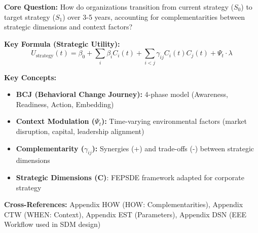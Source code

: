 \begin{tcolorbox}[colback=blue!5!white, colframe=blue!75!black,
    title=Quick Reference: Strategy Design Model v1.0]

\textbf{Core Question:} How do organizations transition from current strategy ($S_0$) to target strategy ($S_1$) over 3-5 years, accounting for complementarities between strategic dimensions and context factors?

\textbf{Key Formula (Strategic Utility):}
\begin{equation}
U_{\text{strategy}}(t) = \beta_0 + \sum_{i} \beta_i C_i(t) + \sum_{i<j} \gamma_{ij} C_i(t) C_j(t) + \Psi_t \cdot \lambda
\end{equation}

\textbf{Key Concepts:}
\begin{itemize}[nosep]
\item \textbf{BCJ (Behavioral Change Journey):} 4-phase model (Awareness, Readiness, Action, Embedding)
\item \textbf{Context Modulation ($\Psi_t$):} Time-varying environmental factors (market disruption, capital, leadership alignment)
\item \textbf{Complementarity ($\gamma_{ij}$):} Synergies (+) and trade-offs (-) between strategic dimensions
\item \textbf{Strategic Dimensions (C)}: FEPSDE framework adapted for corporate strategy
\end{itemize}

\textbf{Cross-References:} Appendix HOW (HOW: Complementarities), Appendix CTW (WHEN: Context), Appendix EST (Parameters), Appendix DSN (EEE Workflow used in SDM design)

\end{tcolorbox}



